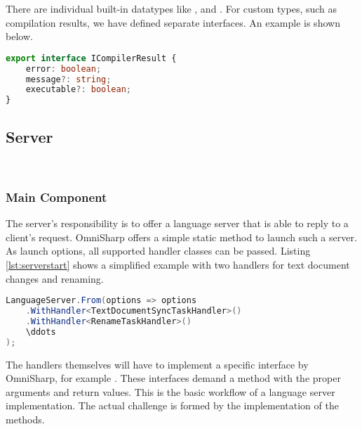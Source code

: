 There are individual built-in datatypes like ,  and  \cite{ts-types}.
For custom types, such as compilation results, we have defined separate interfaces.
An example is shown below.



\begin{lstlisting}[language=typescript, caption={Type Interface Supplementing \code{any}-types}, captionpos=b, label={lst:typeinterface}]
export interface ICompilerResult {
    error: boolean;
    message?: string;
    executable?: boolean;
}
\end{lstlisting}






\subsection{Server}
\\

\subsubsection{Main Component}
The server's responsibility is to offer a language server that is able to reply to a client's request.
OmniSharp offers a simple static method to launch such a server.
As launch options, all supported handler classes can be passed.
Listing \ref{lst:serverstart} shows a simplified example with two handlers for text document changes and renaming.\\

\begin{lstlisting}[language=csharp, caption={Language Server Initialization}, captionpos=b, label={lst:serverstart}]
LanguageServer.From(options => options
    .WithHandler<TextDocumentSyncTaskHandler>()
    .WithHandler<RenameTaskHandler>()
    \ddots
);
\end{lstlisting}

The handlers themselves will have to implement a specific interface by OmniSharp, for example .
These interfaces demand a  method with the proper arguments and return values.
This is the basic workflow of a language server implementation.
The actual challenge is formed by the implementation of the  methods.\\

